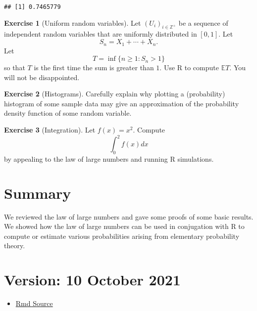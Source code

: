 \documentclass[
]{article}
\providecommand{\tightlist}{%
  \setlength{\itemsep}{0pt}\setlength{\parskip}{0pt}}
\theoremstyle{definition}
\theoremstyle{definition}
\theoremstyle{definition}
\newtheorem{exercise}{Exercise}[section]
\theoremstyle{remark}
\begin{document}
\begin{verbatim}
## [1] 0.7465779
\end{verbatim}

\begin{exercise}[Uniform random variables]
\protect\hypertarget{exr:unnamed-chunk-15}{}{\label{exr:unnamed-chunk-15} \iffalse (Uniform random variables) \fi{} }Let \((U_i)_{i \in \mathbb{Z} ^+}\) be a sequence of independent random variables that are uniformly distributed in \([0,1]\). Let
\[S_n = X_1 + \cdots + X_n.\]
Let \[T = \inf\{n \geq 1:  S_n >1\}\]
so that \(T\) is the first time the sum is greater than \(1\). Use R to compute \(\mathbb{E} T\). You will not be disappointed.
\end{exercise}
\begin{exercise}[Histograms]
\protect\hypertarget{exr:unnamed-chunk-16}{}{\label{exr:unnamed-chunk-16} \iffalse (Histograms) \fi{} }Carefully explain why plotting a (probability) histogram of some sample data may give an approximation of the probability density function of some random variable.
\end{exercise}

\begin{exercise}[Integration]
\protect\hypertarget{exr:unnamed-chunk-17}{}{\label{exr:unnamed-chunk-17} \iffalse (Integration) \fi{} }Let \(f(x) = x^2\). Compute
\[ \int_0 ^2 f(x)dx\]
by appealing to the law of large numbers and running R simulations.
\end{exercise}

\hypertarget{summary}{%
\section{Summary}\label{summary}}

We reviewed the law of large numbers and gave some proofs of some basic results. We showed how the law of large numbers can be used in conjugation with R to compute or estimate various probabilities arising from elementary probability theory.

\hypertarget{version-10-october-2021}{%
\section{Version: 10 October 2021}\label{version-10-october-2021}}

\begin{itemize}
\tightlist
\item
  \href{https://tsoo-math.github.io/ucl/prob-viaR.Rmd}{Rmd Source}
\end{itemize}
\end{document}
